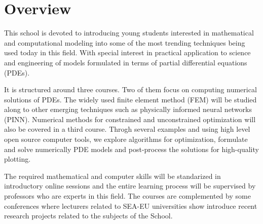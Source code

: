 \documentclass[letterpaper]{inzane_syllabus} %
\begin{document}

\makeprofile %

\section{Overview}
 
This school is devoted to introducing young students interested in mathematical and computational modeling into some of the most trending techniques being used today in this field. With special interest in practical application to science and engineering of models formulated in terms of partial differential equations (PDEs).

It is structured around three courses. Two of them focus on computing numerical solutions of PDEs. The widely used finite element method (FEM) will be studied along to other emerging techniques such as physically informed neural networks (PINN).
Numerical methods for constrained and unconstrained optimization will also be covered in a third course. 
Throgh several examples and using high level open source computer tools, we explore algorithms for optimization, formulate and solve numerically PDE models and post-process the solutions for high-quality plotting. 

The required mathematical and computer skills will be standarized in introductory online sessions and the entire learning process will be supervised by professors who are experts in this field. 
The courses are complemented by some conferences where lecturers related to SEA-EU universities show introduce recent research projects related to the subjects of the School.

\end{document}
